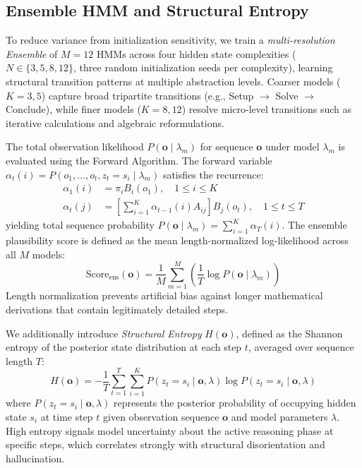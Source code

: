 \documentclass[conference]{IEEEtran}
\begin{document}
\subsection{Ensemble HMM and Structural Entropy}

To reduce variance from initialization sensitivity, we train a \textit{multi-resolution Ensemble} of $M=12$ HMMs across four hidden state complexities ($N \in \{3, 5, 8, 12\}$, three random initialization seeds per complexity), learning structural transition patterns at multiple abstraction levels. Coarser models ($K=3, 5$) capture broad tripartite transitions (e.g., Setup $\to$ Solve $\to$ Conclude), while finer models ($K=8, 12$) resolve micro-level transitions such as iterative calculations and algebraic reformulations.

The total observation likelihood $P(\mathbf{o} \mid \lambda_m)$ for sequence $\mathbf{o}$ under model $\lambda_m$ is evaluated using the Forward Algorithm. The forward variable $\alpha_t(i) = P(o_1, \ldots, o_t, z_t = s_i \mid \lambda_m)$ satisfies the recurrence:
\begin{align}
\alpha_1(i) &= \pi_i B_i(o_1), \quad 1 \le i \le K \\
\alpha_t(j) &= \left[ \sum_{i=1}^K \alpha_{t-1}(i) A_{ij} \right] B_j(o_t), \quad 1 \le t \le T
\end{align}
yielding total sequence probability $P(\mathbf{o} \mid \lambda_m) = \sum_{i=1}^K \alpha_T(i)$. The ensemble plausibility score is defined as the mean length-normalized log-likelihood across all $M$ models:
\begin{equation}
\text{Score}_{\text{ens}}(\mathbf{o}) = \frac{1}{M} \sum_{m=1}^{M} \left( \frac{1}{T} \log P(\mathbf{o} \mid \lambda_m) \right)
\label{eq:ensemble_score}
\end{equation}
Length normalization prevents artificial bias against longer mathematical derivations that contain legitimately detailed steps.

We additionally introduce \textit{Structural Entropy} $H(\mathbf{o})$, defined as the Shannon entropy of the posterior state distribution at each step $t$, averaged over sequence length $T$:
\begin{equation}
H(\mathbf{o}) = -\frac{1}{T} \sum_{t=1}^{T} \sum_{i=1}^{K} P(z_t = s_i \mid \mathbf{o}, \lambda) \log P(z_t = s_i \mid \mathbf{o}, \lambda)
\label{eq:structural_entropy}
\end{equation}
where $P(z_t = s_i \mid \mathbf{o}, \lambda)$ represents the posterior probability of occupying hidden state $s_i$ at time step $t$ given observation sequence $\mathbf{o}$ and model parameters $\lambda$. High entropy signals model uncertainty about the active reasoning phase at specific steps, which correlates strongly with structural disorientation and hallucination.
\end{document}
